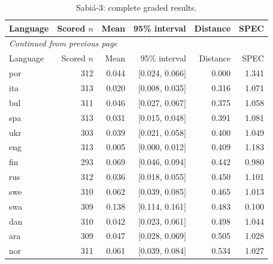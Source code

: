 \begin{longtable}{lrrrrr}

\caption{Sabiá-3: complete graded results.}\label{tab:detail-sabia_3}\\

\toprule

Language & Scored $n$ & Mean & 95\% interval & Distance & SPEC\\\midrule

\endfirsthead

\multicolumn{6}{l}{\textit{Continued from previous page}}\\

\toprule

Language & Scored $n$ & Mean & 95\% interval & Distance & SPEC\\\midrule

\endhead

\bottomrule\endfoot

por & 312 & 0.044 & [0.024, 0.066] & 0.000 & 1.341\\

ita & 313 & 0.020 & [0.008, 0.035] & 0.316 & 1.071\\

bul & 311 & 0.046 & [0.027, 0.067] & 0.375 & 1.058\\

spa & 313 & 0.031 & [0.015, 0.048] & 0.391 & 1.081\\

ukr & 303 & 0.039 & [0.021, 0.058] & 0.400 & 1.049\\

eng & 313 & 0.005 & [0.000, 0.012] & 0.409 & 1.183\\

fin & 293 & 0.069 & [0.046, 0.094] & 0.442 & 0.980\\

rus & 312 & 0.036 & [0.018, 0.055] & 0.450 & 1.101\\

swe & 310 & 0.062 & [0.039, 0.085] & 0.465 & 1.013\\

swa & 309 & 0.138 & [0.114, 0.161] & 0.483 & 0.100\\

dan & 310 & 0.042 & [0.023, 0.061] & 0.498 & 1.044\\

ara & 309 & 0.047 & [0.028, 0.069] & 0.505 & 1.028\\

nor & 311 & 0.061 & [0.039, 0.084] & 0.534 & 1.027\\

\end{longtable}


